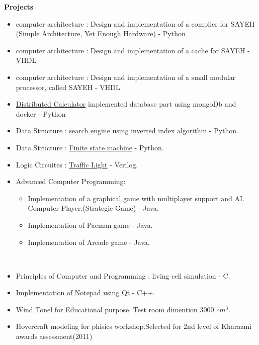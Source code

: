 \documentclass[a4paper,12pt,final]{memoir}
\newcommand{\Sep}{\vspace{1.5em}}
\newcommand{\SmallSep}{\vspace{0.5em}}
\newcommand{\CVSection}[1]
	{\Large\textbf{#1}\par
	\SmallSep\normalsize\normalfont}
\begin{document}
\Sep 

\CVSection{Projects}
\begin{itemize}
	\item computer architecture : Design and implementation of a compiler for SAYEH (Simple Architecture, Yet Enough Hardware) - Python
	\item computer architecture : Design and implementation of a cache for SAYEH - VHDL
	\item computer architecture : Design and implementation of a small modular processor, called SAYEH - VHDL
	\item \href{https:://github.com/DistributedCalc/Database-2}{Distributed Calculator} implemented database part using mongoDb and docker - Python
	\item Data Structure : \href{https://github.com/mahtabfarrokh/SearchEngine}{search engine using inverted index algorithm} - Python.
	\item Data Structure : \href{https://github.com/mahtabfarrokh/Finite-state_machine}{Finite state machine} - Python.
	\item Logic Circuites : \href {https://github.com/mahtabfarrokh/Traffic_Light}{Traffic Light} - Verilog.

	

	\item Advanced Computer Programming:
		\begin{itemize}[$\circ$]
		\item  Implementation of a graphical game with multiplayer support and AI. Computer Player.(Strategic Game) - Java.
		
			

     	\item Implementation of Pacman game - Java.
	    \item Implementation of Arcade game - Java.
		\end{itemize}
		
	\end{itemize}
	\newpage
\normalsize\normalfont
\framebreak
\framebreak
\\

\Sep
\begin{itemize}
	\item Principles of Computer and Programming : living cell simulation - C.
	\item \href {https://github.com/mahtabfarrokh/NotePad}{Implementation of Notepad using Qt} - C++.
	\item Wind Tonel for Educational purpose. Test room dimention 3000
$cm^{3}$.
	\item Hovercraft modeling for phisics workshop.Selected for 2nd level of Kharazmi awards assessment(2011)
 
\end{itemize}
\end{document}
